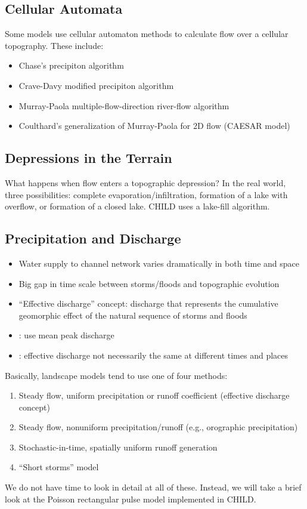 \documentclass[12pt]{amsart}
\begin{document}
\subsection{Cellular Automata}

Some models use cellular automaton methods to calculate flow over a cellular topography. These include:
\begin{itemize}
\item Chase's precipiton algorithm
\item Crave-Davy modified precipiton algorithm
\item Murray-Paola multiple-flow-direction river-flow algorithm
\item Coulthard's generalization of Murray-Paola for 2D flow (CAESAR model)
\end{itemize}

\subsection{Depressions in the Terrain}

What happens when flow enters a topographic depression? In the real world, three possibilities: complete evaporation/infiltration, formation of a lake with overflow, or formation of a closed lake. CHILD uses a lake-fill algorithm.


\subsection{Precipitation and Discharge}

\begin{itemize}
\item Water supply to channel network varies dramatically in both time and space
\item Big gap in time scale between storms/floods and topographic evolution
\item ``Effective discharge'' concept: discharge that represents the cumulative geomorphic effect of the natural sequence of storms and floods
\item \citet{willgoose1991coupled}: use mean peak discharge
\item \citet{huang2006evaluation}: effective discharge not necessarily the same at different times and places
\end{itemize}
Basically, landscape models tend to use one of four methods:
\begin{enumerate}
\item Steady flow, uniform precipitation or runoff coefficient (effective discharge concept)
\item Steady flow, nonuniform precipitation/runoff (e.g., orographic precipitation)
\item Stochastic-in-time, spatially uniform runoff generation
\item ``Short storms'' model \citep{solyom2004effect}
\end{enumerate}
We do not have time to look in detail at all of these. Instead, we will take a brief look at the Poisson rectangular pulse model implemented in CHILD.
\end{document}
